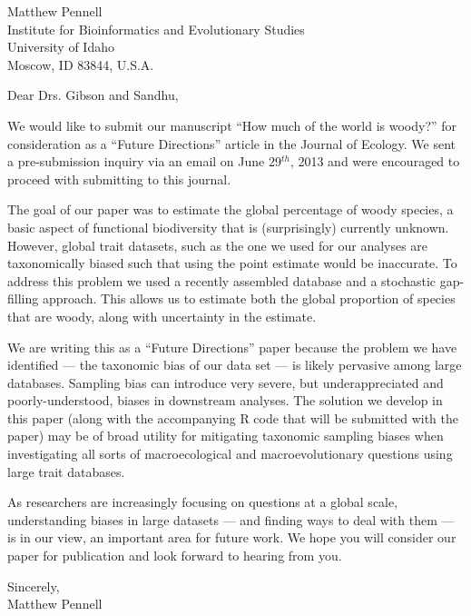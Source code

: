 \documentclass[a4paper,12pt]{article}
\begin{document}
{\raggedleft
  Matthew Pennell\\
  Institute for Bioinformatics and Evolutionary Studies\\
  University of Idaho\\
 Moscow, ID 83844, U.S.A.\\[2ex]
}

\vspace{3ex}

Dear Drs. Gibson and Sandhu,

We would like to submit our manuscript ``How much of the world is woody?'' for consideration as a ``Future Directions'' article in the Journal of Ecology. We sent a pre-submission inquiry via an email on June 29$^{th}$, 2013 and were encouraged to proceed with submitting to this journal.
					
The goal of our paper was to estimate the global percentage of woody species, a basic aspect of functional biodiversity that is (surprisingly) currently unknown. However, global trait datasets, such as the one we used for our analyses are taxonomically biased such that using the point estimate would be inaccurate. To address this problem we used a recently assembled database and a stochastic gap-filling approach. This allows us to estimate both the global proportion of species that are woody, along with uncertainty in the estimate. 

We are writing this as a ``Future Directions'' paper because the problem we have identified --- the taxonomic bias of our data set --- is likely pervasive among large databases. Sampling bias can introduce very severe, but underappreciated and poorly-understood, biases in downstream analyses. The solution we develop in this paper (along with the accompanying R code that will be submitted with the paper) may be of broad utility for mitigating taxonomic sampling biases when investigating all sorts of macroecological and macroevolutionary questions using large trait databases.

As researchers are increasingly focusing on questions at a global scale, understanding biases in large datasets --- and finding ways to deal with them --- is in our view, an important area for future work. We hope you will consider our paper for publication and look forward to hearing from you.

\begin{flushright}
\vspace{2ex}
\hspace{.2\textwidth}Sincerely,\\
\hspace*{.3\textwidth}
Matthew Pennell
\end{flushright}
\end{document}
